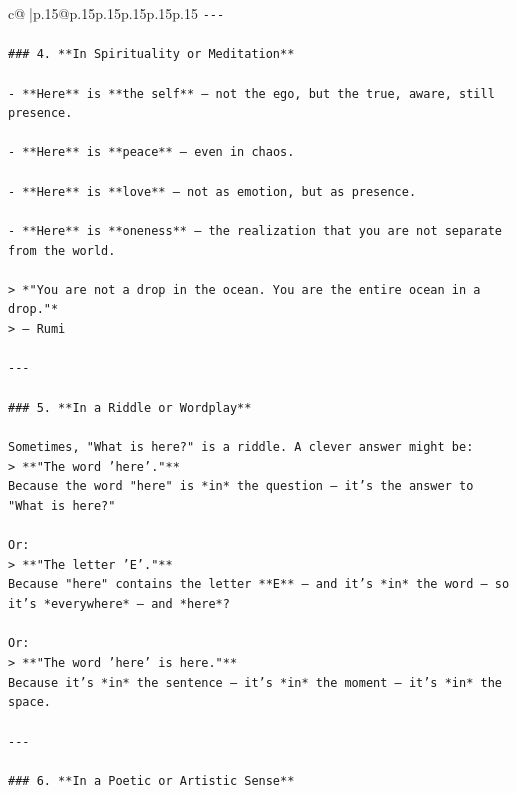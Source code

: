 \documentclass{article}
\begin{document}
{\begin{supertabular}{c@{$\;$}|p{.15\linewidth}@{}p{.15\linewidth}p{.15\linewidth}p{.15\linewidth}p{.15\linewidth}p{.15\linewidth}}
{{{\texttt{{-}{-}{-}} \\
\\ 
\texttt{\#\#\# 4. **In Spirituality or Meditation**} \\
\\ 
\texttt{{-} **Here** is **the self** — not the ego, but the true, aware, still presence.} \\
\\ 
\texttt{{-} **Here** is **peace** — even in chaos.} \\
\\ 
\texttt{{-} **Here** is **love** — not as emotion, but as presence.} \\
\\ 
\texttt{{-} **Here** is **oneness** — the realization that you are not separate from the world.} \\
\\ 
\texttt{> *"You are not a drop in the ocean. You are the entire ocean in a drop."*  } \\
\texttt{> — Rumi} \\
\\ 
\texttt{{-}{-}{-}} \\
\\ 
\texttt{\#\#\# 5. **In a Riddle or Wordplay**} \\
\\ 
\texttt{Sometimes, "What is here?" is a riddle. A clever answer might be:} \\
\texttt{> **"The word 'here'."**  } \\
\texttt{Because the word "here" is *in* the question — it’s the answer to "What is here?"} \\
\\ 
\texttt{Or:} \\
\texttt{> **"The letter 'E'."**  } \\
\texttt{Because "here" contains the letter **E** — and it’s *in* the word — so it’s *everywhere* — and *here*?} \\
\\ 
\texttt{Or:} \\
\texttt{> **"The word 'here' is here."**  } \\
\texttt{Because it’s *in* the sentence — it’s *in* the moment — it’s *in* the space.} \\
\\ 
\texttt{{-}{-}{-}} \\
\\ 
\texttt{\#\#\# 6. **In a Poetic or Artistic Sense**} \\
}}}
\end{supertabular}}
\end{document}
